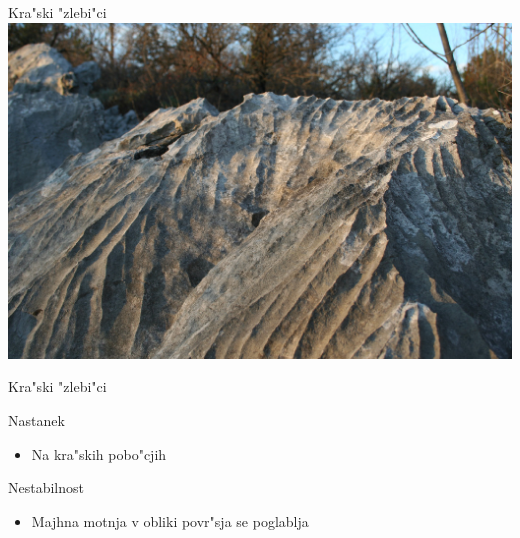 \documentclass{beamer}
\begin{document}
\begin{frame}{Kra"ski "zlebi"ci}
\includegraphics[width=\textwidth]{./Slike/Zlebici}

\end{frame}

\begin{frame}{Kra"ski "zlebi"ci}
  \begin{block}{Nastanek}
  \begin{itemize}
    \item Na kra"skih pobo"cjih
    \end{itemize}
  \end{block}
  
  \begin{block}{Nestabilnost}
  \begin{itemize}
    \item Majhna motnja v obliki povr"sja se poglablja
    \end{itemize}
  \end{block}

\end{frame}
\end{document}
